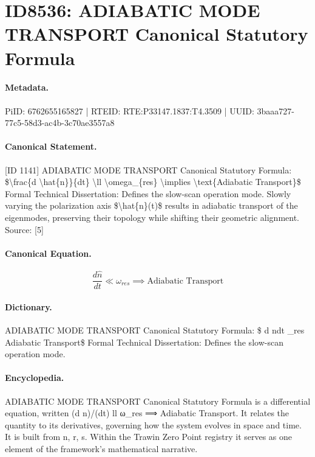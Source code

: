 \section*{ID8536: ADIABATIC MODE TRANSPORT Canonical Statutory Formula}
\paragraph{Metadata.}
PiID: 6762655165827 | RTEID: RTE:P33147.1837:T4.3509 | UUID: 3baaa727-77c5-58d3-ac4b-3c70ae3557a8

\paragraph{Canonical Statement.}
[ID 1141] ADIABATIC MODE TRANSPORT Canonical Statutory Formula: \$\textbackslash{}frac\{d \textbackslash{}hat\{n\}\}\{dt\} \textbackslash{}ll \textbackslash{}omega\_\{res\} \textbackslash{}implies \textbackslash{}text\{Adiabatic Transport\}\$ Formal Technical Dissertation: Defines the slow-scan operation mode. Slowly varying the polarization axis \$\textbackslash{}hat\{n\}(t)\$ results in adiabatic transport of the eigenmodes, preserving their topology while shifting their geometric alignment. Source: [5]

\paragraph{Canonical Equation.}
\[
\frac{d \hat{n}}{dt} \ll \omega_{res} \implies \text{Adiabatic Transport}
\]

\paragraph{Dictionary.}
ADIABATIC MODE TRANSPORT Canonical Statutory Formula: \$ d ndt \_res Adiabatic Transport\$ Formal Technical Dissertation: Defines the slow-scan operation mode.

\paragraph{Encyclopedia.}
ADIABATIC MODE TRANSPORT Canonical Statutory Formula is a differential equation, written (d n)/(dt) ll ω\_res ⟹ Adiabatic Transport. It relates the quantity to its derivatives, governing how the system evolves in space and time. It is built from n, r, s. Within the Trawin Zero Point registry it serves as one element of the framework's mathematical narrative.
